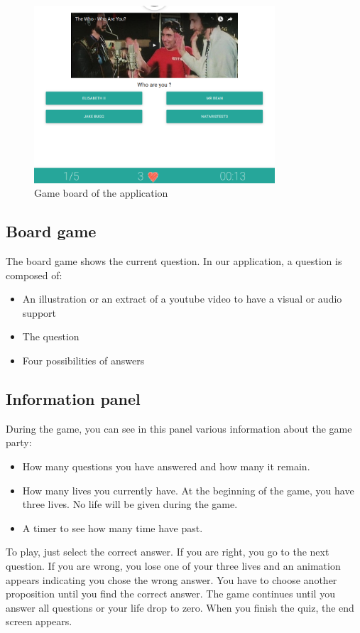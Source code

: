 \documentclass[a4paper,11pt, oneside]{book}
\begin{document}
\begin{figure} [htbp]
	\centering
	\includegraphics[width=0.8\textwidth]{CGame.png}
	\caption{Game board of the application}
\end{figure}


\subsection{Board game}
The board game shows the current question. In our application, a question is composed of:
\begin{itemize}
	\item An illustration or an extract of a youtube video to have a visual or audio support
	\item The question
	\item Four possibilities of answers
\end{itemize}

\subsection{Information panel}
	During the game, you can see in this panel various information about the game party:
	\begin{itemize}
	\item How many questions you have answered and how many it remain.
	\item How many lives you currently have. At the beginning of the game, you have three lives. No life will be given during the game.
	\item A timer to see how many time have past.
	\end{itemize}

To play, just select the correct answer.
If you are right, you go to the next question.
If you are wrong, you lose one of your three lives and an animation appears indicating you chose the wrong answer. You have to choose another proposition until you find the correct answer.
The game continues until you answer all questions or your life drop to zero.
When you finish the quiz, the end screen appears.
\end{document}
